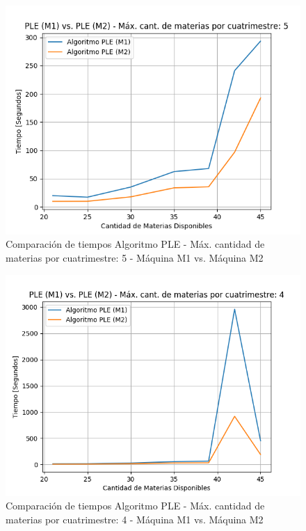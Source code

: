 \documentclass[a4paper]{article}
\begin{document}
\begin{figure}[H]
\centering
\includegraphics[scale=0.65]{Imagenes/m1_vs_m2_max_mat_5.png}\par
\caption{Comparación de tiempos Algoritmo PLE - Máx. cantidad de materias por cuatrimestre: 5 - Máquina M1 vs. Máquina M2}
\end{figure}

\begin{figure}[H]
\centering
\includegraphics[scale=0.65]{Imagenes/m1_vs_m2_max_mat_4.png}\par
\caption{Comparación de tiempos Algoritmo PLE - Máx. cantidad de materias por cuatrimestre: 4 - Máquina M1 vs. Máquina M2}
\end{figure}
\end{document}
